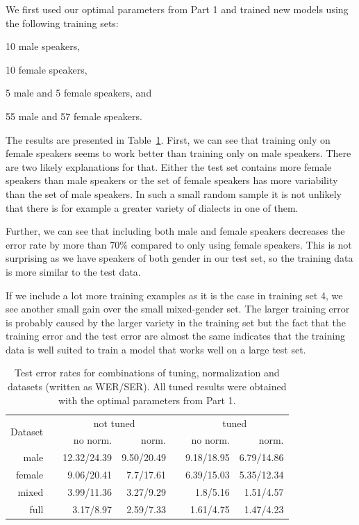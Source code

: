 \documentclass[twocolumn, 11pt]{article}
\begin{document}
We first used our optimal parameters from Part 1 and trained new models using
the following training sets:
\begin{inparaenum}[1)]
  \item 10 male speakers,
  \item 10 female speakers,
  \item 5 male and 5 female speakers, and
  \item 55 male and 57 female speakers.
\end{inparaenum}

The results are presented in Table~\ref{tab:wer-comb}\@. First, we can see that training only
on female speakers seems to work better than training only on male speakers.
There are two likely explanations for that. Either the test set contains
more female speakers than male speakers or the set of female speakers has more
variability than the set of male speakers. In such a small random sample it is
not unlikely that there is for example a greater variety of dialects in one of them.

Further, we can see that including both male and female speakers decreases the
error rate by more than 70\% compared to only using female speakers. This is not
surprising as we have speakers of both gender in our test set, so the training
data is more similar to the test data.

If we include a lot more training examples as it is the case in training set 4,
we see another small gain over the small mixed-gender set. The larger training
error is probably caused by the larger variety in the training set but the fact
that the training error and the test error are almost the same indicates that
the training data is well suited to train a model that works well on a large
test set.

\begin{table}\centering
  \begin{tabular}{@{}rcrrcrr@{}}\toprule%
    \multirow{2}{*}{Dataset} & \phantom{a} & \multicolumn{2}{c}{not tuned}
    & \phantom{a} & \multicolumn{2}{c}{tuned}\\
    \cmidrule{3-4} \cmidrule{6-7}
    && no norm. & norm. && no norm. & norm.\\ \midrule%
    male && 12.32/24.39 & 9.50/20.49 && 9.18/18.95 & 6.79/14.86\\
    female && 9.06/20.41 & 7.7/17.61 && 6.39/15.03 & 5.35/12.34\\
    mixed && 3.99/11.36 & 3.27/9.29 && 1.8/5.16 & 1.51/4.57\\
    full && 3.17/8.97 & 2.59/7.33 && 1.61/4.75 & 1.47/4.23\\
  \end{tabular}
  \caption{Test error rates for combinations of tuning, normalization and
  datasets (written as WER/SER). All tuned results were obtained with the optimal parameters from Part 1.}\label{tab:wer-comb}
\end{table}
\end{document}
